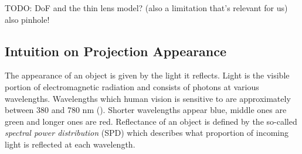 {\color{red} TODO: DoF and the thin lens model? (also a limitation that's relevant for us) also pinhole!}

\subsection{Intuition on Projection Appearance}
\label{section:background-projection_mapping-projection_intuition}

The appearance of an object is given by the light it reflects. Light is the visible portion of electromagnetic radiation and consists of photons at various wavelengths. Wavelengths which human vision is sensitive to are approximately between 380 and 780 nm (\citet{PBRT3e}). Shorter wavelengths appear blue, middle ones are green and longer ones are red. Reflectance of an object is defined by the so-called \textit{spectral power distribution} (SPD) which describes what proportion of incoming light is reflected at each wavelength.

